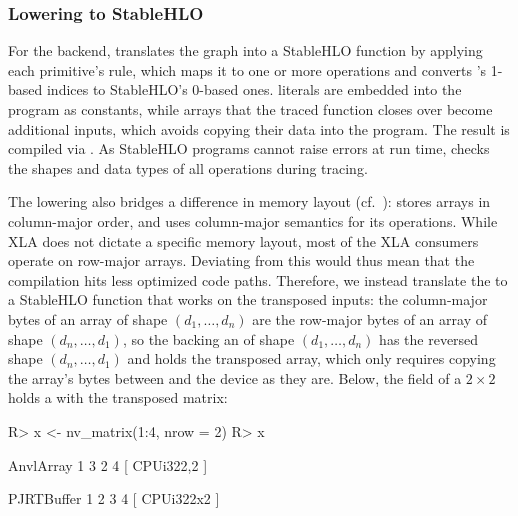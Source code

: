 \documentclass[article,shortnames]{jss}
\renewenvironment{CodeChunk}{\par\addvspace{0.6\baselineskip}\noindent\begin{minipage}{\linewidth}}{\end{minipage}\par\vspace{0.6\baselineskip}}
\begin{document}
\subsubsection{Lowering to StableHLO}

For the  backend,  translates the graph into a StableHLO function by applying each primitive's  rule, which maps it to one or more  operations and converts 's 1-based indices to StableHLO's 0-based ones.
 literals are embedded into the program as constants, while arrays that the traced function closes over become additional inputs, which avoids copying their data into the program.
The result is compiled via .
As StableHLO programs cannot raise errors at run time,  checks the shapes and data types of all operations during tracing.

The lowering also bridges a difference in memory layout (cf.~):  stores arrays in column-major order, and  uses column-major semantics for its operations.
While XLA does not dictate a specific memory layout, most of the XLA consumers operate on row-major arrays.
Deviating from this would thus mean that the compilation hits less optimized code paths.
Therefore, we instead translate the  to a StableHLO function that works on the transposed inputs: the column-major bytes of an array of shape $(d_1, \ldots, d_n)$ are the row-major bytes of an array of shape $(d_n, \ldots, d_1)$, so the  backing an  of shape $(d_1, \ldots, d_n)$ has the reversed shape $(d_n, \ldots, d_1)$ and holds the transposed array, which only requires copying the array's bytes between  and the device as they are.
Below, the field  of a $2 \times 2$  holds a  with the transposed matrix:

\begin{CodeChunk}
\begin{CodeInput}
R> x <- nv_matrix(1:4, nrow = 2)
R> x
\end{CodeInput}
\begin{CodeOutput}
AnvlArray
 1 3
 2 4
[ CPUi32{2,2} ]
\end{CodeOutput}
\begin{CodeOutput}
PJRTBuffer
 1 2
 3 4
[ CPUi32{2x2} ]
\end{CodeOutput}
\end{CodeChunk}
\end{document}
